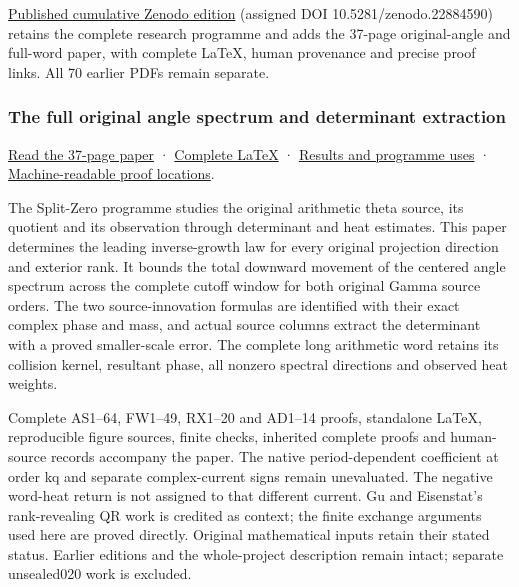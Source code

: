\documentclass[
]{article}
\begin{document}
\href{https://zenodo.org/records/22884590}{Published cumulative Zenodo
edition} (assigned DOI 10.5281/zenodo.22884590) retains the complete
research programme and adds the 37-page original-angle and full-word
paper, with complete LaTeX, human provenance and precise proof links.
All 70 earlier PDFs remain separate.

\subsubsection{The full original angle spectrum and determinant
extraction}\label{the-full-original-angle-spectrum-and-determinant-extraction}

\href{https://github.com/KokunoYumeto/zeta-function-research-reader/blob/main/workbenches/splitzero-tandem/continuations/20260921-original-angle-word/ORIGINAL_ANGLE_WORD_READER.pdf}{Read
the 37-page paper} ·
\href{https://github.com/KokunoYumeto/zeta-function-research-reader/blob/main/workbenches/splitzero-tandem/continuations/20260921-original-angle-word/ORIGINAL_ANGLE_WORD_READER.tex}{Complete
LaTeX} ·
\href{https://github.com/KokunoYumeto/zeta-function-research-reader/blob/main/workbenches/splitzero-tandem/continuations/20260921-original-angle-word/RESULTS_20260921_019.md}{Results
and programme uses} ·
\href{https://github.com/KokunoYumeto/zeta-function-research-reader/blob/main/workbenches/splitzero-tandem/continuations/20260921-original-angle-word/RESULT_INDEX.json}{Machine-readable
proof locations}.

The Split-Zero programme studies the original arithmetic theta source,
its quotient and its observation through determinant and heat estimates.
This paper determines the leading inverse-growth law for every original
projection direction and exterior rank. It bounds the total downward
movement of the centered angle spectrum across the complete cutoff
window for both original Gamma source orders. The two source-innovation
formulas are identified with their exact complex phase and mass, and
actual source columns extract the determinant with a proved
smaller-scale error. The complete long arithmetic word retains its
collision kernel, resultant phase, all nonzero spectral directions and
observed heat weights.

Complete AS1--64, FW1--49, RX1--20 and AD1--14 proofs, standalone LaTeX,
reproducible figure sources, finite checks, inherited complete proofs
and human-source records accompany the paper. The native
period-dependent coefficient at order kq and separate complex-current
signs remain unevaluated. The negative word-heat return is not assigned
to that different current. Gu and Eisenstat's rank-revealing QR work is
credited as context; the finite exchange arguments used here are proved
directly. Original mathematical inputs retain their stated status.
Earlier editions and the whole-project description remain intact;
separate unsealed020 work is excluded.
\end{document}
